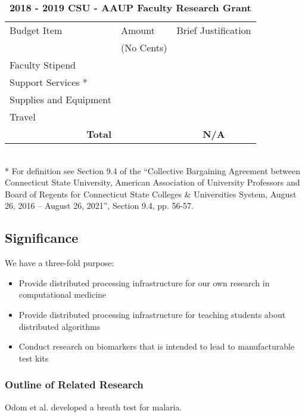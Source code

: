 \documentclass[]{article}
\begin{document}
\begin{table}[H]
	\caption{\textbf{2018 - 2019 CSU - AAUP Faculty Research Grant}}
\begin{tabular}{|p{4cm}|p{3cm}|c|}
	\hline 
Budget Item	&Amount &  Brief Justification\\ 
 	&(No Cents) &   \\ 
	\hline 
Faculty Stipend	&  &  \\ 
	\hline 
Support Services *	&  &  \\ 
	\hline 
Supplies and Equipment	&  &  \\ 
	\hline 
Travel	&  &  \\ 
	\hline \hline
 \multicolumn{1}{|r|}{\textbf{Total}}	&  & \textbf{N/A} \\ 
	\hline 
\end{tabular} \\
* For definition see Section 9.4 of the ``Collective Bargaining Agreement between Connecticut State University, American Association of University Professors and Board of Regents for Connecticut State Colleges \& Universities System, August 26, 2016 – August 26, 2021'', Section 9.4, pp. 56-57.
\end{table}


\subsection{Significance}%
We have a three-fold purpose: 
\begin{itemize}
	\item Provide distributed processing infrastructure for our own research in computational medicine
	\item Provide distributed processing infrastructure for teaching students about distributed algorithms
	\item Conduct research on biomarkers that is intended to lead to manufacturable test kits
\end{itemize}

\subsubsection{Outline of Related Research}%
Odom et al. \cite{aakelly2015malaria} developed a breath test for malaria.
\end{document}
